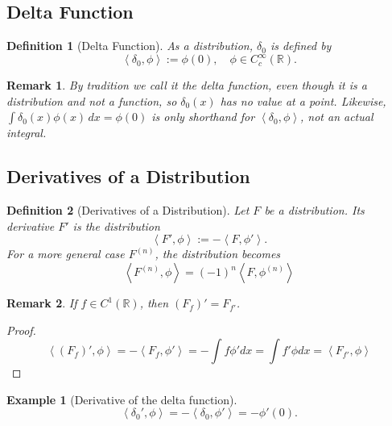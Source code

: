 \documentclass{article}
\newtheorem{definition}{Definition}
\newtheorem*{example}{Example}
\newtheorem{remark}{Remark}
\newcommand{\R}{\mathbb{R}}
\newcommand{\ip}[2]{\left\langle #1, #2 \right\rangle}
\begin{document}
\subsection{Delta Function}
\begin{definition}[Delta Function]
    As a distribution, $\delta_0$ is defined by
    \[\ip{\delta_0}{\phi} := \phi(0),\quad \phi\in C_c^{\infty}(\R).\]
\end{definition}
\begin{remark}
    By tradition we call it the delta function, even though it is a distribution and not a function, so $\delta_0(x)$ has no value at a point. Likewise, $\int\delta_0(x)\phi(x)\,dx = \phi(0)$ is only shorthand for $\ip{\delta_0}{\phi}$, not an actual integral.
\end{remark}

\subsection{Derivatives of a Distribution}
\begin{definition}[Derivatives of a Distribution]
    Let $F$ be a distribution. Its derivative $F'$ is the distribution
    \begin{equation}
        \label{eq:distribution-derivative}
        \ip{F'}{\phi} := -\ip{F}{\phi'}.
    \end{equation}
    For a more general case $F^{(n)}$, the distribution becomes
    \[\ip{F^{(n)}}{\phi} = (-1)^n\ip{F}{\phi^{(n)}}\]
\end{definition}
\begin{remark}
    If $f\in C^1(\R)$, then $(F_f)' = F_{f'}$.
\end{remark}
\begin{proof}
    \[\ip{(F_f)'}{\phi} = -\ip{F_f}{\phi'} = -\int f\phi' dx = \int f'\phi dx = \ip{F_{f'}}{\phi}\]
\end{proof}
\begin{example}[Derivative of the delta function]
    \[\ip{\delta_0'}{\phi} = -\ip{\delta_0}{\phi'} = -\phi'(0).\]
\end{example}
\end{document}
